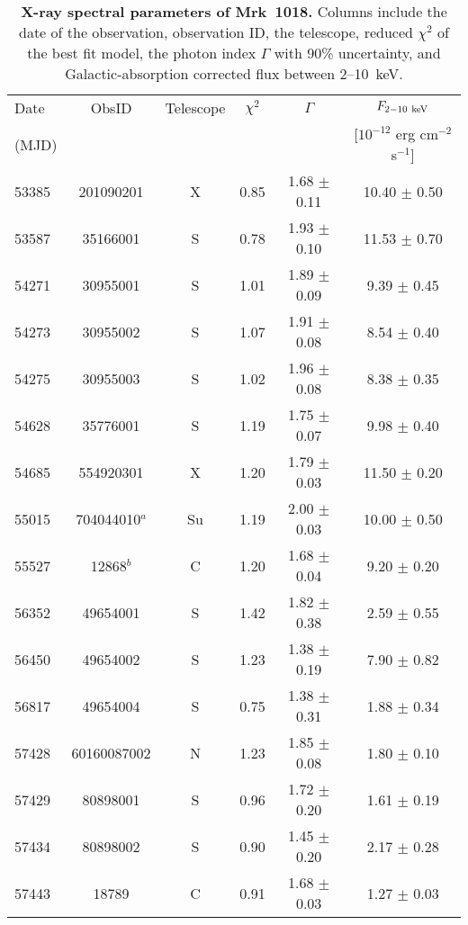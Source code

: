 \begin{table*}
\caption{{ \bf X-ray spectral parameters of Mrk~1018. } Columns include the date of the observation, observation ID, the telescope, reduced $\chi ^2$ of the best fit model, the photon index $\Gamma$ with 90\% uncertainty, and Galactic-absorption corrected flux between 2--10~keV. \label{tab:tablexray}}
\begin{tabular}{lccccc}
 \hline
 \hline
 Date   &   ObsID & Telescope  & $\chi ^2$ &  $\Gamma$ & $F_{\rm{2-10~keV}}$     \\ 
 (MJD)  &         &             &           &           & [$10^{-12}$ erg cm$^{-2}$\rm{s}$^{-1}$]   \\ 
\hline
    53385 & 201090201 & X & 0.85 & 1.68 $\pm$ 0.11 & 10.40 $\pm$ 0.50  \\
     53587 & 35166001 & S & 0.78 & 1.93 $\pm$ 0.10 & 11.53 $\pm$ 0.70  \\
     54271 & 30955001 & S & 1.01 & 1.89 $\pm$ 0.09 & 9.39 $\pm$ 0.45  \\
     54273 & 30955002 & S & 1.07 & 1.91 $\pm$ 0.08 & 8.54 $\pm$ 0.40  \\
     54275 & 30955003 & S & 1.02 & 1.96 $\pm$ 0.08 & 8.38 $\pm$ 0.35  \\
     54628 & 35776001 & S & 1.19 & 1.75 $\pm$ 0.07 & 9.98 $\pm$ 0.40  \\
     54685 & 554920301 & X & 1.20 & 1.79 $\pm$ 0.03 & 11.50 $\pm$ 0.20  \\
     55015 & 704044010$^{a}$ & Su & 1.19 & 2.00 $\pm$ 0.03 & 10.00 $\pm$ 0.50  \\
     55527 & 12868$^{b}$ & C & 1.20 & 1.68 $\pm$ 0.04 & 9.20 $\pm$ 0.20  \\
     56352 & 49654001 & S & 1.42 & 1.82 $\pm$ 0.38 & 2.59 $\pm$ 0.55  \\
     56450 & 49654002 & S & 1.23 & 1.38 $\pm$ 0.19 & 7.90 $\pm$ 0.82  \\
     56817 & 49654004 & S & 0.75 & 1.38 $\pm$ 0.31 & 1.88 $\pm$ 0.34  \\
     57428 & 60160087002 & N & 1.23 & 1.85 $\pm$ 0.08 & 1.80 $\pm$ 0.10  \\
     57429 & 80898001 & S & 0.96 & 1.72 $\pm$ 0.20 & 1.61 $\pm$ 0.19  \\
     57434 & 80898002 & S & 0.90 & 1.45 $\pm$ 0.20 & 2.17 $\pm$ 0.28  \\
     57443 & 18789 & C & 0.91 & 1.68 $\pm$ 0.03 & 1.27 $\pm$ 0.03  \\

\end{tabular}
\end{table*}
